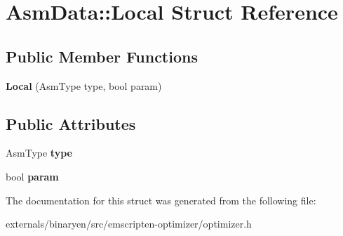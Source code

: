 \hypertarget{struct_asm_data_1_1_local}{}\section{Asm\+Data\+:\+:Local Struct Reference}
\label{struct_asm_data_1_1_local}
\subsection*{Public Member Functions}
\begin{DoxyCompactItemize}
\item 
\mbox{\label{struct_asm_data_1_1_local_a1be8da64b1480dd979082097c6810ed8}} 
{\bfseries Local} (Asm\+Type type, bool param)
\end{DoxyCompactItemize}
\subsection*{Public Attributes}
\begin{DoxyCompactItemize}
\item 
\mbox{\label{struct_asm_data_1_1_local_a9fd6e4f8d99db1dee1de947bd8d7ba3b}} 
Asm\+Type {\bfseries type}
\item 
\mbox{\label{struct_asm_data_1_1_local_ab8688d83bc16779511f5d8ab9907167e}} 
bool {\bfseries param}
\end{DoxyCompactItemize}


The documentation for this struct was generated from the following file\+:\begin{DoxyCompactItemize}
\item 
externals/binaryen/src/emscripten-\/optimizer/optimizer.\+h\end{DoxyCompactItemize}

